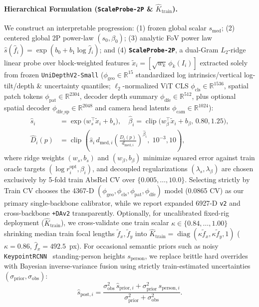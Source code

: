 \documentclass[10pt,twocolumn,letterpaper]{article}
\begin{document}
\paragraph{Hierarchical Formulation (\texttt{ScaleProbe-2P} \& $\hat{K}_{\mathrm{train}}$).}
We construct an interpretable progression: (1) frozen global scalar $s_{\mathrm{med}}$; (2) centered global 2P power-law $(s_0, \beta_0)$; (3) analytic FoV power law $\hat{s}(\hat{f}_i)=\exp(b_0 + b_1 \log\hat{f}_i)$; and (4) \textbf{\texttt{ScaleProbe-2P}}, a dual-Gram $L_2$-ridge linear probe over block-weighted features $\tilde{x}_i = [\sqrt{w_k}\,\phi_k(I_i)]$ extracted solely from frozen \texttt{UniDepthV2-Small} ($\phi_{\text{geo}}\in\mathbb{R}^{15}$ standardized log intrinsics/vertical log-tilt/depth \& uncertainty quantiles; $\ell_2$-normalized ViT CLS $\phi_{\text{cls}}\in\mathbb{R}^{1536}$, spatial patch tokens $\phi_{\text{pat}}\in\mathbb{R}^{2304}$, decoder depth summary $\phi_{\text{dfe}}\in\mathbb{R}^{512}$, plus optional spatial decoder $\phi_{\text{dfe\_sp}}\in\mathbb{R}^{2048}$ and camera head latents $\phi_{\text{cam}}\in\mathbb{R}^{1024}$):
\begin{align}
  \hat{s}_i &= \exp\!\big(w_s^\top \tilde{x}_i + b_s\big), \quad
  \hat{\beta}_i = \operatorname{clip}\!\big(w_\beta^\top \tilde{x}_i + b_\beta,\, 0.80, 1.25\big), \nonumber\\
  \hat{D}_i(p) &= \operatorname{clip}\!\left(\hat{s}_i\, d_{\text{med}, i} \left(\frac{D_i(p)}{d_{\text{med}, i}}\right)^{\hat{\beta}_i},\; 10^{-3}, 10\right),
  \label{eq:probe2p}
\end{align}
where ridge weights $(w_s, b_s)$ and $(w_\beta, b_\beta)$ minimize squared error against train oracle targets $(\log r_i^{\text{opt}}, \beta_i)$, and decoupled regularizations $(\lambda_s, \lambda_\beta)$ are chosen exclusively by 5-fold train AbsRel CV over $\{0.005,\dots,10.0\}$. Selecting strictly by Train CV chooses the 4367-D $(\phi_{\text{geo}}, \phi_{\text{cls}}, \phi_{\text{pat}}, \phi_{\text{dfe}})$ model (0.0865 CV) as our primary single-backbone calibrator, while we report expanded 6927-D \texttt{v2} and cross-backbone \texttt{+DAv2} transparently. Optionally, for uncalibrated fixed-rig deployment ($\hat{K}_{\mathrm{train}}$), we cross-validate one train scalar $\kappa \in \{0.84,\dots,1.00\}$ shrinking median train focal lengths $\tilde{f}_x,\tilde{f}_y$ into $\hat{K}_{\mathrm{train}}=\operatorname{diag}(\kappa\tilde{f}_x, \kappa\tilde{f}_y, 1)$ ($\kappa=0.86$, $\hat{f}_x=492.5$~px). For occasional semantic priors such as noisy \texttt{KeypointRCNN}~\cite{he2017maskrcnn} standing-person heights $s_{\text{person}}$, we replace brittle hard overrides with Bayesian inverse-variance fusion using strictly train-estimated uncertainties $(\sigma_{\text{prior}}, \sigma_{\text{obs}})$:
\begin{equation}
  \hat{s}_{\text{post}, i} = \frac{\sigma_{\text{obs}}^2\, \hat{s}_{\text{prior}, i} + \sigma_{\text{prior}}^2\, s_{\text{person}, i}}{\sigma_{\text{prior}}^2 + \sigma_{\text{obs}}^2}.
  \label{eq:bayes}
\end{equation}
\end{document}
